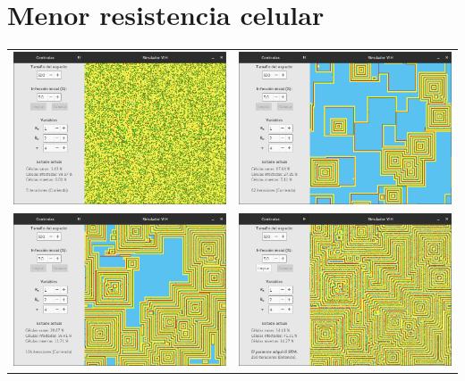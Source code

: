 \documentclass[12pt,letterpaper,oneside]{report}
\begin{document}
	\section{Menor resistencia celular} %
	\label{sec:menor_resistencia_celular}
	\begin{center}
		\begin{tabular}{c c}
		\includegraphics[width=8cm]{img/resistencia/prueba/baja/1.png} & \includegraphics[width=8cm]{img/resistencia/prueba/baja/2.png} \\[1cm]
		\includegraphics[width=8cm]{img/resistencia/prueba/baja/3.png} & \includegraphics[width=8cm]{img/resistencia/prueba/baja/4.png} \\
		\end{tabular}
	\end{center}
\end{document}
